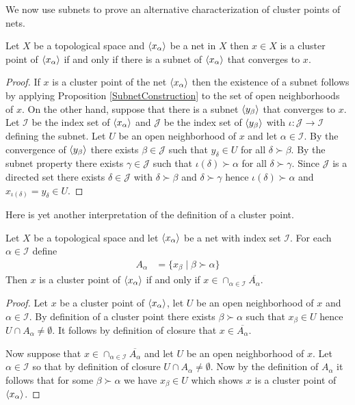 We now use subnets to prove an alternative characterization of cluster points of nets.
\begin{prop}\label{ClusterPointsAndSubnets}Let $X$ be a topological space and $\langle x_{\alpha} \rangle$ be a net in $X$ then $x \in X$ is a cluster point of $\langle x_{\alpha} \rangle$ if and only if there is a 
subnet of $\langle x_{\alpha} \rangle$ that converges to $x$.
\end{prop}
\begin{proof}
If $x$ is a cluster point of the net $\langle x_{\alpha} \rangle$ then the existence of a subnet follows by applying Proposition \ref{SubnetConstruction} to the set of open neighborhoods of $x$.  On the other hand, suppose that there is a subnet $\langle y_{\beta} \rangle$ that converges to $x$.  Let $\mathcal{I}$ be the index set of $\langle x_{\alpha} \rangle$ and $\mathcal{J}$ be the index set of $\langle y_{\beta} \rangle$ with $\iota : \mathcal{J} \to \mathcal{I}$ defining the subnet.  Let $U$ be an open neighborhood of $x$ and let $\alpha \in \mathcal{I}$. By the convergence of $\langle y_{\beta} \rangle$ there exists $\beta \in \mathcal{J}$ such that $y_\delta \in U$ for all $\delta \succ \beta$.  By the subnet property there exists $\gamma \in \mathcal{J}$ such that $\iota(\delta) \succ \alpha$ for all $\delta \succ \gamma$.  Since $\mathcal{J}$ is a directed set there exists $\delta \in \mathcal{J}$ with $\delta \succ \beta$ and $\delta \succ \gamma$ hence $\iota(\delta) \succ \alpha$ and $x_{\iota(\delta)} = y_\delta \in U$.
\end{proof}

Here is yet another interpretation of the definition of a cluster point.
\begin{lem}\label{ClusterPointsAndClosures}Let $X$ be a topological space and let $\langle x_{\alpha} \rangle$ be a net with index set $\mathcal{I}$.  For each $\alpha \in \mathcal{I}$ define
\begin{align*}
A_\alpha &= \lbrace x_\beta \mid \beta \succ \alpha \rbrace
\end{align*}
Then $x$ is a cluster point of $\langle x_{\alpha} \rangle$ if and only if $x \in \cap_{\alpha \in \mathcal{I}} \overline{A_\alpha}$.
\end{lem}
\begin{proof}
Let $x$ be a cluster point of $\langle x_{\alpha} \rangle$, let $U$ be an open neighborhood of $x$ and $\alpha \in \mathcal{I}$.  By definition of a cluster point there exists $\beta \succ \alpha$ such that $x_\beta \in U$ hence $U \cap A_\alpha \neq \emptyset$.  It follows by definition of closure that $x \in \overline{A_\alpha}$.

Now suppose that $x \in \cap_{\alpha \in \mathcal{I}} \overline{A_\alpha}$ and let $U$ be an open neighborhood of $x$.  Let $\alpha \in \mathcal{I}$ so that by definition of closure $U \cap A_\alpha \neq \emptyset$.  Now by the definition of $A_\alpha$ it follows that for some $\beta \succ \alpha$ we have $x_\beta \in U$ which shows $x$ is a cluster point of $\langle x_{\alpha} \rangle$.
\end{proof}

